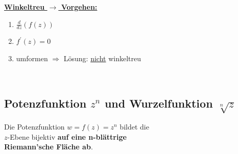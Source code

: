 		\begin{minipage}[]{0.35\textwidth}
			\underline{\textbf{Winkeltreu $\rightarrow$ Vorgehen:}}
			\begin{enumerate}
				\item $\frac{d}{dz} (f(z))$
				\item $f^{\prime}\left( z \right) = 0$
				\item umformen $\Rightarrow$ Lösung: \underline{nicht} winkeltreu
			\end{enumerate}
		\end{minipage}\\[3pt]
	
	\subsection{Potenzfunktion $z^n$ und Wurzelfunktion $\sqrt[n]{z}$}
		\begin{minipage}[]{0.5\textwidth}
			\begin{framed}
				Die Potenzfunktion $w = f\left( z \right) = z^n$ bildet die\\[3pt]
				$z$-Ebene bijektiv \textbf{auf eine n-blättrige\\[3pt] Riemann'sche Fläche ab}.
			\end{framed}
		\end{minipage}
		\begin{minipage}[]{0.5\textwidth}
			\centering
		\end{minipage}
	
